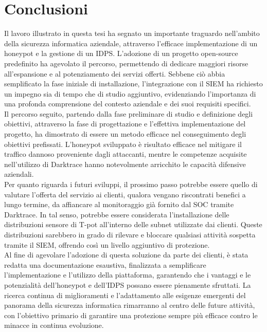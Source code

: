 \chapter{Conclusioni}
Il lavoro illustrato in questa tesi ha segnato un importante traguardo nell'ambito della sicurezza informatica aziendale, attraverso l'efficace implementazione di un honeypot e la gestione di un IDPS. L'adozione di un progetto open-source predefinito ha agevolato il percorso, permettendo di dedicare maggiori risorse all'espansione e al potenziamento dei servizi offerti. Sebbene ciò abbia semplificato la fase iniziale di installazione, l'integrazione con il SIEM ha richiesto un impegno sia di tempo che di studio aggiuntivo, evidenziando l'importanza di una profonda comprensione del contesto aziendale e dei suoi requisiti specifici.\\
Il percorso seguito, partendo dalla fase preliminare di studio e definizione degli obiettivi, attraverso la fase di progettazione e l'effettiva implementazione del progetto, ha dimostrato di essere un metodo efficace nel conseguimento degli obiettivi prefissati. L'honeypot sviluppato è risultato efficace nel mitigare il traffico dannoso proveniente dagli attaccanti, mentre le competenze acquisite nell'utilizzo di Darktrace hanno notevolmente arricchito le capacità difensive aziendali.\\
Per quanto riguarda i futuri sviluppi, il prossimo passo potrebbe essere quello di valutare l'offerta del servizio ai clienti, qualora vengano riscontrati benefici a lungo termine, da affiancare al monitoraggio già fornito dal SOC tramite Darktrace. In tal senso, potrebbe essere considerata l'installazione delle distribuzioni sensore di T-pot all'interno delle subnet utilizzate dai clienti. Queste distribuzioni sarebbero in grado di rilevare e bloccare qualsiasi attività sospetta tramite il SIEM, offrendo così un livello aggiuntivo di protezione.\\
Al fine di agevolare l'adozione di questa soluzione da parte dei clienti, è stata redatta una documentazione esaustiva, finalizzata a semplificare l'implementazione e l'utilizzo della piattaforma, garantendo che i vantaggi e le potenzialità dell'honeypot e dell'IDPS possano essere pienamente sfruttati. La ricerca continua di miglioramenti e l'adattamento alle esigenze emergenti del panorama della sicurezza informatica rimarranno al centro delle future attività, con l'obiettivo primario di garantire una protezione sempre più efficace contro le minacce in continua evoluzione.